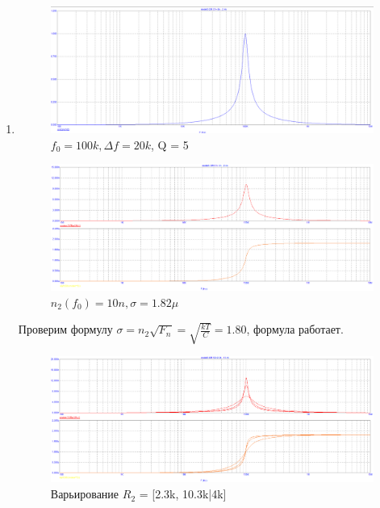 \documentclass[a4paper, 12pt]{article}%
\begin{document}
\begin{enumerate}

\item

\begin{figure}[h!]
    \centering
    \includegraphics[scale=0.3]{images/mod3_2_1.png}
    \caption{$f_0 = 100k, \Delta f = 20k$, Q = 5}
    \label{fig:m321}
\end{figure}

\begin{figure}[h!]
    \centering
    \includegraphics[scale=0.3]{images/mod3_2_2.png}
    \caption{$n_2(f_0) = 10n, \sigma = 1.82\mu$}
    \label{fig:m322}
\end{figure}

Проверим формулу $\sigma = n_2\sqrt{F_n} = \sqrt{\frac{kT}{C}} = 1.80$, формула работает.

\begin{figure}[h!]
    \centering
    \includegraphics[scale=0.3]{images/mod3_2_3.png}
    \caption{Варьирование $R_2$ = [2.3k, 10.3k|4k]}
    \label{fig:m323}
\end{figure}


\end{enumerate}
\end{document}
